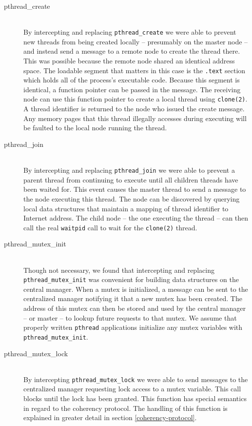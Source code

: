 \begin{description}
\item[pthread\_create] \hfill \\
By intercepting and replacing \verb,pthread_create, we were able to prevent new threads from being created locally -- presumably on the master node -- and instead send a message to a remote node to create the thread there.  This was possible because the remote node shared an identical address space.  The loadable segment that matters in this case is the \verb,.text, section which holds all of the process's executable code.  Because this segment is identical, a function pointer can be passed in the message.  The receiving node can use this function pointer to create a local thread using \verb,clone(2),.  A thread identifier is returned to the node who issued the create message.  Any memory pages that this thread illegally accesses during executing will be faulted to the local node running the thread.

\item[pthread\_join] \hfill \\
By intercepting and replacing \verb,pthread_join, we were able to prevent a parent thread from continuing to execute until all children threads have been waited for.  This event causes the master thread to send a message to the node executing this thread.  The node can be discovered by querying local data structures that maintain a mapping of thread identifier to Internet address.  The child node -- the one executing the thread -- can then call the real \verb,waitpid, call to wait for the \verb,clone(2), thread.

\item[pthread\_mutex\_init] \hfill \\
Though not necessary, we found that intercepting and replacing \verb,pthread_mutex_init, was convenient for building data structures on the central manager.  When a mutex is initialized, a message can be sent to the centralized manager notifying it that a new mutex has been created.  The address of this mutex can then be stored and used by the central manager -- or master -- to lookup future requests to that mutex.  We assume that properly written \verb,pthread, applications initialize any mutex variables with \verb,pthread_mutex_init,.

\item[pthread\_mutex\_lock] \hfill \\
By intercepting \verb,pthread_mutex_lock, we were able to send messages to the centralized manager requesting lock access to a mutex variable.  This call blocks until the lock has been granted.  This function has special semantics in regard to the coherency protocol.  The handling of this function is explained in greater detail in section \ref{coherency-protocol}.


\end{description}

